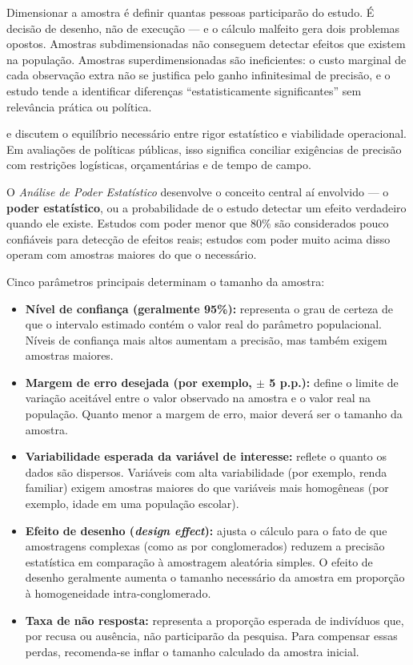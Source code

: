 \documentclass[12pt, a4paper, openany]{book}
\begin{document}
Dimensionar a amostra \'e definir quantas pessoas participar\~ao do estudo. \'E decis\~ao de desenho, n\~ao de execu\c{c}\~ao --- e o c\'alculo malfeito gera dois problemas opostos. Amostras subdimensionadas n\~ao conseguem detectar efeitos que existem na popula\c{c}\~ao. Amostras superdimensionadas s\~ao ineficientes: o custo marginal de cada observa\c{c}\~ao extra n\~ao se justifica pelo ganho infinitesimal de precis\~ao, e o estudo tende a identificar diferen\c{c}as ``estatisticamente significantes'' sem relev\^ancia pr\'atica ou pol\'itica.

\citet{duflo2007using} e \citet{gertler2018impact} discutem o equil\'ibrio necess\'ario entre rigor estat\'istico e viabilidade operacional. Em avalia\c{c}\~oes de pol\'iticas p\'ublicas, isso significa conciliar exig\^encias de precis\~ao com restri\c{c}\~oes log\'isticas, or\c{c}ament\'arias e de tempo de campo.

O \textit{An\'alise de Poder Estat\'istico} \citep{fgvclear2025poder} desenvolve o conceito central a\'i envolvido --- o \textbf{poder estat\'istico}, ou a probabilidade de o estudo detectar um efeito verdadeiro quando ele existe. Estudos com poder menor que 80\% s\~ao considerados pouco confi\'aveis para detec\c{c}\~ao de efeitos reais; estudos com poder muito acima disso operam com amostras maiores do que o necess\'ario.

Cinco par\^ametros principais determinam o tamanho da amostra:

\begin{itemize}
\item \textbf{N\'ivel de confian\c{c}a (geralmente 95\%):} representa o grau de certeza de que o intervalo estimado cont\'em o valor real do par\^ametro populacional. N\'iveis de confian\c{c}a mais altos aumentam a precis\~ao, mas tamb\'em exigem amostras maiores.
\item \textbf{Margem de erro desejada (por exemplo, $\pm$ 5 p.p.):} define o limite de varia\c{c}\~ao aceit\'avel entre o valor observado na amostra e o valor real na popula\c{c}\~ao. Quanto menor a margem de erro, maior dever\'a ser o tamanho da amostra.
\item \textbf{Variabilidade esperada da vari\'avel de interesse:} reflete o quanto os dados s\~ao dispersos. Vari\'aveis com alta variabilidade (por exemplo, renda familiar) exigem amostras maiores do que vari\'aveis mais homog\^eneas (por exemplo, idade em uma popula\c{c}\~ao escolar).
\item \textbf{Efeito de desenho (\textit{design effect}):} ajusta o c\'alculo para o fato de que amostragens complexas (como as por conglomerados) reduzem a precis\~ao estat\'istica em compara\c{c}\~ao \`a amostragem aleat\'oria simples. O efeito de desenho geralmente aumenta o tamanho necess\'ario da amostra em propor\c{c}\~ao \`a homogeneidade intra-conglomerado.
\item \textbf{Taxa de n\~ao resposta:} representa a propor\c{c}\~ao esperada de indiv\'iduos que, por recusa ou aus\^encia, n\~ao participar\~ao da pesquisa. Para compensar essas perdas, recomenda-se inflar o tamanho calculado da amostra inicial.
\end{itemize}
\end{document}
